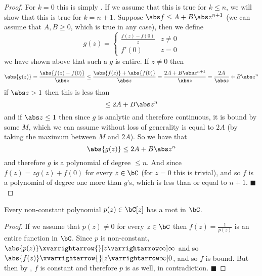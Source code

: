 \documentclass[10pt]{article}
\let\to=\varrightarrow
\def\qed{\hskip1cm\hbox{}\hfill$\blacksquare$}
\begin{document}
\begin{proof}

    For $k=0$ this is simply .
    If we assume that this is true for $k\leq n$, we will show that this is true for $k=n+1$.
    Suppose $\abs f\leq A+B\abs z^{n+1}$ (we can assume that $A,B\geq0$, which is true in any case), then we define
    \[ g(z) = \begin{cases} \frac{f(z)-f(0)}z & z\neq0 \\ f'(0) & z=0 \end{cases} \]
    we have shown above that such a $g$ is entire.
    If $z\neq0$ then
    \[ \abs{g(z)} = \frac{\abs{f(z) - f(0)}}{\abs z} \leq \frac{\abs{f(z)} + \abs{f(0)}}{\abs z} = \frac{2A + B\abs z^{n+1}}{\abs z} = \frac{2A}{\abs z} + B\abs z^n \]
    if $\abs z>1$ then this is less than
    \[ \leq 2A + B\abs z^n \]
    and if $\abs z\leq 1$ then since $g$ is analytic and therefore continuous, it is bound by some $M$, which we can assume without loss of generality is equal to $2A$ (by taking the maximum between $M$ and
    $2A$).
    So we have that
    \[ \abs{g(z)} \leq 2A + B\abs z^n \]
    and therefore $g$ is a polynomial of degree $\leq n$.
    And since $f(z)=zg(z)+f(0)$ for every $z\in\bC$ (for $z=0$ this is trivial), and so $f$ is a polynomial of degree one more than $g$'s, which is less than or equal to $n+1$.
    \qed

\end{proof}

\newpage
\begin{thrm*}

    Every non-constant polynomial $p(z)\in\bC[z]$ has a root in $\bC$.

\end{thrm*}

\begin{proof}

    If we assume that $p(z)\neq0$ for every $z\in\bC$ then $f(z)=\frac1{p(z)}$ is an entire function in $\bC$.
    Since $p$ is non-constant, $\abs{p(z)}\xvarrightarrow{}[z\to\infty]\infty$ and so $\abs{f(z)}\xvarrightarrow{}[z\to\infty]0$, and so $f$ is bound.
    But then by , $f$ is constant and therefore $p$ is as well, in contradiction.
    \qed

\end{proof}
\end{document}
